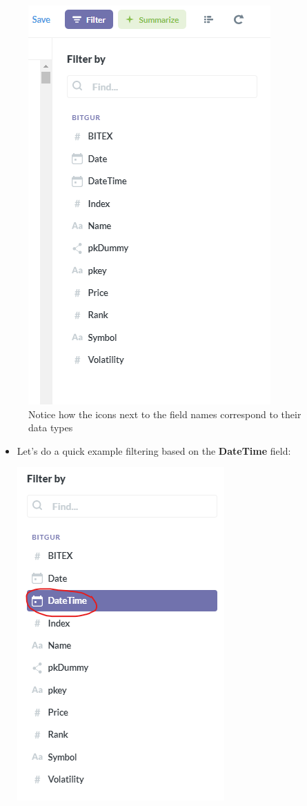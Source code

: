 \documentclass[
]{book}
\begin{document}
\begin{itemize}
\begin{itemize}
    \begin{figure}
    \centering
    \includegraphics{images/FilterSidebar.png}
    \caption{Notice how the icons next to the field names correspond to their data types}
    \end{figure}

    \begin{itemize}
    \item
      Let's do a quick example filtering based on the \textbf{DateTime} field:

      \includegraphics{images/DateTimeClick.png}


\end{itemize}
\end{itemize}
\end{itemize}
\end{document}
